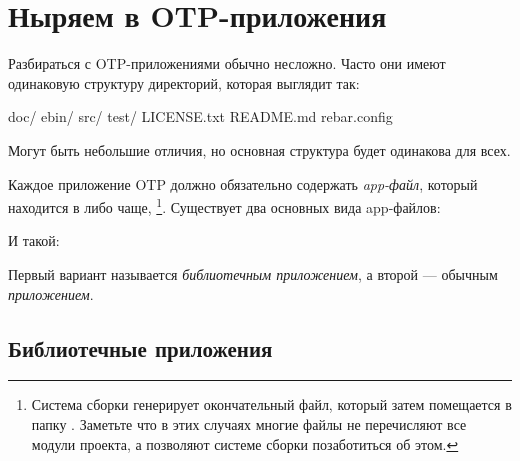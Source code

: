 \documentclass[11pt, oneside]{book}   	%
\begin{document}
\section{Ныряем в OTP-приложения}
\label{sec:dive-otp-applications}

Разбираться с OTP-приложениями обычно несложно. Часто они имеют одинаковую структуру директорий, которая выглядит так:

\begin{VerbatimRaw}
doc/
ebin/
src/
test/
LICENSE.txt
README.md
rebar.config
\end{VerbatimRaw}

Могут быть небольшие отличия, но основная структура будет одинакова для всех.

Каждое приложение OTP должно обязательно содержать \emph{app-файл}, который находится в  либо чаще, \footnote{Система сборки генерирует окончательный файл, который затем помещается в папку . Заметьте что в этих случаях многие файлы   не перечисляют все модули проекта, а позволяют системе сборки позаботиться об этом.}. Существует два основных вида app-файлов:


И такой:


Первый вариант называется \emph{библиотечным приложением}, а второй --- обычным \emph{приложением}.


\subsection{Библиотечные приложения}
\label{subsec:dive-library-applications}
\end{document}

